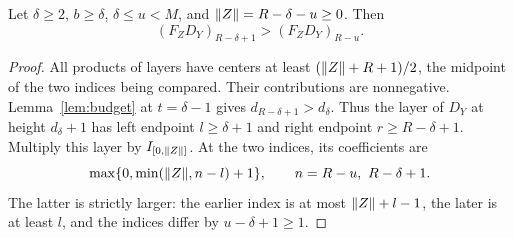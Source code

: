 \begin{lemma}\label{lem:gap}
Let $\delta\ge2$, $b\ge\delta$, $\delta\le u<M$, and $\lVert Z\rVert=R-\delta-u\ge0$. Then
\[
 (F_ZD_Y)_{R-\delta+1}>(F_ZD_Y)_{R-u}.
\]
\end{lemma}
\begin{proof}
All products of layers have centers at least $(\lVert Z\rVert+R+1)/2$, the midpoint of the two indices being compared. Their contributions are nonnegative. Lemma~\ref{lem:budget} at $t=\delta-1$ gives $d_{R-\delta+1}>d_\delta$. Thus the layer of $D_Y$ at height $d_\delta+1$ has left endpoint $l\ge\delta+1$ and right endpoint $r\ge R-\delta+1$. Multiply this layer by $I_{[0,\lVert Z\rVert]}$. At the two indices, its coefficients are
\[
 \max\{0,\min(\wt Z,n-l)+1\},\qquad n=R-u,\ R-\delta+1.
\]
The latter is strictly larger: the earlier index is at most $\lVert Z\rVert+l-1$, the later is at least $l$, and the indices differ by $u-\delta+1\ge1$.
\end{proof}

